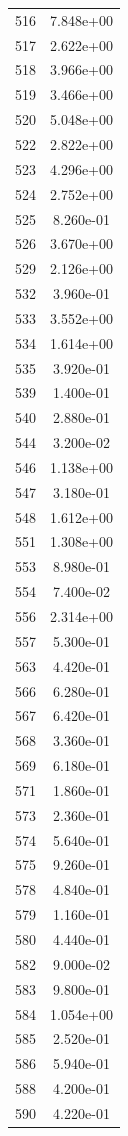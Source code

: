 \documentclass[12pt]{article}
\begin{document}
\begin{longtable}{@{}cc@{}}
516 & 7.848e+00 \\
517 & 2.622e+00 \\
518 & 3.966e+00 \\
519 & 3.466e+00 \\
520 & 5.048e+00 \\
522 & 2.822e+00 \\
523 & 4.296e+00 \\
524 & 2.752e+00 \\
525 & 8.260e-01 \\
526 & 3.670e+00 \\
529 & 2.126e+00 \\
532 & 3.960e-01 \\
533 & 3.552e+00 \\
534 & 1.614e+00 \\
535 & 3.920e-01 \\
539 & 1.400e-01 \\
540 & 2.880e-01 \\
544 & 3.200e-02 \\
546 & 1.138e+00 \\
547 & 3.180e-01 \\
548 & 1.612e+00 \\
551 & 1.308e+00 \\
553 & 8.980e-01 \\
554 & 7.400e-02 \\
556 & 2.314e+00 \\
557 & 5.300e-01 \\
563 & 4.420e-01 \\
566 & 6.280e-01 \\
567 & 6.420e-01 \\
568 & 3.360e-01 \\
569 & 6.180e-01 \\
571 & 1.860e-01 \\
573 & 2.360e-01 \\
574 & 5.640e-01 \\
575 & 9.260e-01 \\
578 & 4.840e-01 \\
579 & 1.160e-01 \\
580 & 4.440e-01 \\
582 & 9.000e-02 \\
583 & 9.800e-01 \\
584 & 1.054e+00 \\
585 & 2.520e-01 \\
586 & 5.940e-01 \\
588 & 4.200e-01 \\
590 & 4.220e-01 \\

\end{longtable}
\end{document}
